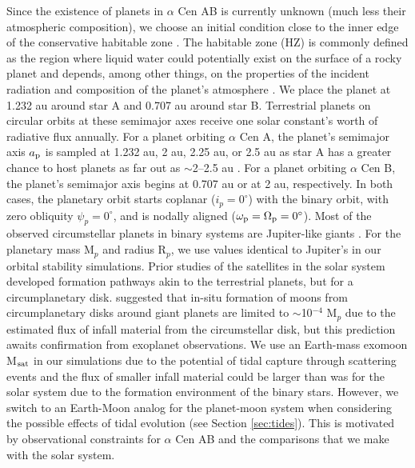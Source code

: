 \documentclass[preprint]{aastex63}
\begin{document}
Since the existence of planets in $\alpha$ Cen AB is currently unknown (much less their atmospheric composition), we choose an initial condition close to the inner edge of the conservative habitable zone \citep{eggl2020habitable}. The habitable zone (HZ) is commonly defined as the region where liquid water could potentially exist on the surface of a rocky planet and depends, among other things, on the properties of the incident radiation and composition of the planet's atmosphere \citep{Kasting1993,Kopparapu2014,eggl2020habitable}. We place the planet at 1.232 au around star A and 0.707 au around star B.  Terrestrial planets on circular orbits at these semimajor axes receive one solar constant's worth of radiative flux annually.
For a planet orbiting $\alpha$ Cen A, the planet's semimajor axis $a_{\rm p}$ is sampled at 1.232 au, 2 au, 2.25 au, or 2.5 au as star A has a greater chance to host planets as far out as $\sim$2--2.5 au \citep{Quarles2016}.  For a planet orbiting $\alpha$ Cen B, the planet's semimajor axis begins at 0.707 au or at 2 au, respectively. In both cases, the planetary orbit starts coplanar ($i_p = 0^\circ$) with the binary orbit, with zero obliquity $\psi_p = 0^\circ$, and is nodally aligned ($\omega_{\rm p}=\Omega_{\rm p} = 0^\circ$).  
Most of the observed circumstellar planets in binary systems are Jupiter-like giants \citep{Schwarz2016}.  For the planetary mass M$_p$ and radius R$_p$, we use values identical to Jupiter's in our orbital stability simulations.  Prior studies of the satellites in the solar system \citep{Estrada2006,Canup2006} developed formation pathways akin to the terrestrial planets, but for a circumplanetary disk.  \cite{Canup2006} suggested that in-situ formation of moons from circumplanetary disks around giant planets are limited to $\sim$10$^{-4}$ M$_p$ due to the estimated flux of infall material from the circumstellar disk, but this prediction awaits confirmation from exoplanet observations.  We use an Earth-mass exomoon M$_{\rm sat}$ in our simulations due to the potential of tidal capture through scattering events and the flux of smaller infall material could be larger than was for the solar system due to the formation environment of the binary stars.  However, we switch to an Earth-Moon analog for the planet-moon system when considering the possible effects of tidal evolution (see Section \ref{sec:tides}).  This is motivated by observational constraints for $\alpha$ Cen AB \citep{Zhao2018} and the comparisons that we make with the solar system. 
\end{document}

